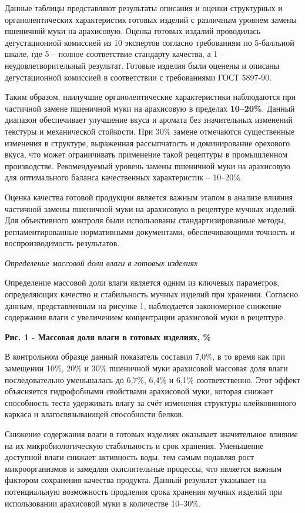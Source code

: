 {{{Данные таблицы представляют результаты описания и оценки структурных и
органолептических характеристик готовых изделий с различным уровнем
замены пшеничной муки на арахисовую. Оценка готовых издалий проводилась
дегустационной комиссией из 10 экспертов согласно требованиям по
5-балльной шкале, где 5 -- полное соответствие стандарту качества, а 1
-- неудовлетворительный результат. Готовые изделия были оценены и
описаны дегустационной комиссией в соответствии с требованиями ГОСТ
5897-90.

Таким образом, наилучшие органолептические характеристики наблюдаются
при частичной замене пшеничной муки на арахисовую в пределах
{\bfseries 10--20\%}. Данный диапазон обеспечивает улучшение вкуса и
аромата без значительных изменений текстуры и механической стойкости.
При 30\% замене отмечаются существенные изменения в структуре,
выраженная рассыпчатость и доминирование орехового вкуса, что может
ограничивать применение такой рецептуры в промышленном производстве.
Рекомендуемый уровень замены пшеничной муки на арахисовую для
оптимального баланса качественных характеристик -- 10--20\%.

Оценка качества готовой продукции является важным этапом в анализе
влияния частичной замены пшеничной муки на арахисовую в рецептуре мучных
изделий. Для объективного контроля были использованы стандартизированные
методы, регламентированные нормативными документами, обеспечивающими
точность и воспроизводимость результатов.

\emph{Определение массовой доли влаги в готовых изделиях}

Определение массовой доли влаги является одним из ключевых параметров,
определяющих качество и стабильность мучных изделий при хранении.
Согласно данным, представленным на рисунке 1, наблюдается закономерное
снижение содержания влаги с увеличением концентрации арахисовой муки в
рецептуре.

{\bfseries Рис. 1 - Массовая доля влаги в готовых изделиях, \%}

В контрольном образце данный показатель составил 7,0\%, в то время как
при замещении 10\%, 20\% и 30\% пшеничной муки арахисовой массовая доля
влаги последовательно уменьшалась до 6,7\%, 6,4\% и 6,1\%
соответственно. Этот эффект объясняется гидрофобными свойствами
арахисовой муки, которая снижает способность теста удерживать влагу за
счёт изменения структуры клейковинного каркаса и влагосвязывающей
способности белков.

Снижение содержания влаги в готовых изделиях оказывает значительное
влияние на их микробиологическую стабильность и срок хранения.
Уменьшение доступной влаги снижает активность воды, тем самым подавляя
рост микроорганизмов и замедляя окислительные процессы, что является
важным фактором сохранения качества продукта. Данный результат указывает
на потенциальную возможность продления срока хранения мучных изделий при
использовании арахисовой муки в количестве 10--30\%.

}}}
